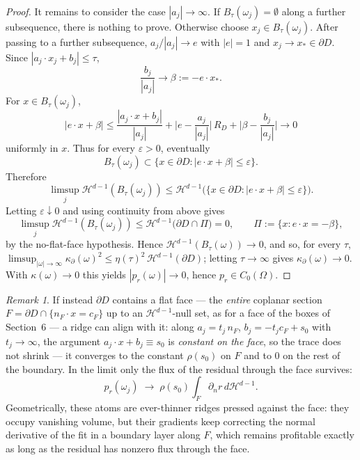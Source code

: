 \documentclass[11pt]{amsart}
\theoremstyle{definition}
\theoremstyle{remark}
\newtheorem{remark}[theorem]{Remark}
\begin{document}
\begin{proof}
It remains to consider the case $|a_j| \to \infty$. If
$B_\tau(\omega_j)=\emptyset$ along a further subsequence, there is nothing to
prove. Otherwise choose $x_j\in B_\tau(\omega_j)$. After passing to a further
subsequence, $a_j/|a_j|\to e$ with $|e|=1$ and
$x_j\to x_*\in\partial D$. Since $|a_j\cdot x_j+b_j|\le\tau$,
\begin{equation*}
	\frac{b_j}{|a_j|}\to \beta := -e\cdot x_*.
\end{equation*}
For $x\in B_\tau(\omega_j)$,
\begin{equation*}
	|e \cdot x + \beta|
	\le \frac{|a_j \cdot x + b_j|}{|a_j|}
	+ \Big| e - \frac{a_j}{|a_j|} \Big|\, R_D
	+ \Big| \beta - \frac{b_j}{|a_j|} \Big|
	\to 0
\end{equation*}
uniformly in $x$. Thus for every $\varepsilon>0$, eventually
\begin{equation*}
	B_\tau(\omega_j)
	\subset \{x\in\partial D: |e\cdot x+\beta|\le \varepsilon\}.
\end{equation*}
Therefore
\begin{equation*}
	\limsup_j \mathcal{H}^{d-1}(B_\tau(\omega_j))
	\le
	\mathcal{H}^{d-1}\big(\{x\in\partial D: |e\cdot x+\beta|\le \varepsilon\}\big).
\end{equation*}
Letting $\varepsilon\downarrow0$ and using continuity from above gives
\begin{equation*}
	\limsup_j \mathcal{H}^{d-1}(B_\tau(\omega_j))
	\le
	\mathcal{H}^{d-1}\big(\partial D\cap\Pi\big)=0,
	\qquad
	\Pi:=\{x:e\cdot x=-\beta\},
\end{equation*}
by the no-flat-face hypothesis. Hence
$\mathcal{H}^{d-1}(B_\tau(\omega)) \to 0$, and so, for every $\tau$,
$\limsup_{|\omega| \to \infty} \kappa_\partial(\omega)^2 \le
\eta(\tau)^2 \, \mathcal{H}^{d-1}(\partial D)$; letting
$\tau \to \infty$ gives $\kappa_\partial(\omega) \to 0$. With
$\kappa(\omega) \to 0$ this yields $|p_r(\omega)| \to 0$, hence
$p_r \in C_0(\Omega)$.
\end{proof}
   
\begin{remark}\label{rem:no_escape} 
If instead $\partial D$ contains a flat face --- the \emph{entire} coplanar
section $F = \partial D \cap \{n_F \cdot x = c_F\}$ up to an
$\mathcal{H}^{d-1}$-null set, as for a face of the boxes of Section~6 --- a
ridge can align with it: along $a_j = t_j\, n_F$, $b_j = -t_j c_F + s_0$ with
$t_j \rightarrow \infty$, the argument $a_j \cdot x + b_j \equiv s_0$ is
\emph{constant on the face}, so the trace does not shrink --- it converges to
the constant $\rho(s_0)$ on $F$ and to $0$ on the rest of the boundary. In the
limit only the flux of the residual through the face survives:
\begin{equation*}
	p_r(\omega_j) \;\rightarrow\; \rho(s_0) \int_F \partial_n r \, d\mathcal{H}^{d-1}.
\end{equation*}
Geometrically, these atoms are ever-thinner ridges pressed against the face:
they occupy vanishing volume, but their gradients keep correcting the normal
derivative of the fit in a boundary layer along $F$, which remains profitable
exactly as long as the residual has nonzero flux through the face. 
\end{remark}
\end{document}
